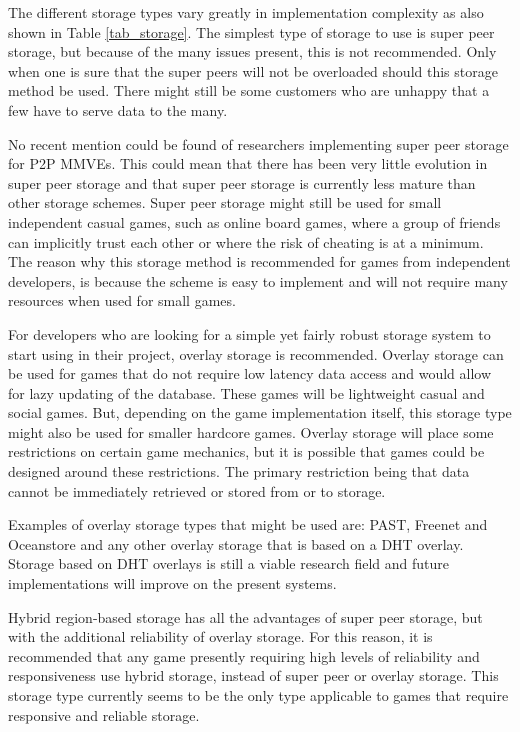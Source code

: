 The different storage types vary greatly in implementation complexity as also shown in Table \ref{tab_storage}. The simplest type of storage to use
is super peer storage, but because of the many issues present, this is not recommended. Only when one is sure that the super peers will not be
overloaded should this storage method be used. There might still be some customers who are unhappy that a few have to serve data to the many.

No recent mention could be found of researchers implementing super peer storage for P2P MMVEs. This could mean that there has been very little
evolution in super peer storage and that super peer storage is currently less mature than other storage schemes. Super peer storage might still be
used for small independent casual games, such as online board games, where a group of friends can implicitly trust each other or where the risk of
cheating is at a minimum. The reason why this storage method is recommended for games from independent developers, is because the scheme is easy to
implement and will not require many resources when used for small games.

For developers who are looking for a simple yet fairly robust storage system to start using in their project, overlay storage is recommended. Overlay
storage can be used for games that do not require low latency data access and would allow for lazy updating of the database. These games will be
lightweight casual and social games. But, depending on the game implementation itself, this storage type might also be used for smaller hardcore
games. Overlay storage will place some restrictions on certain game mechanics, but it is possible that games could be designed around these
restrictions. The primary restriction being that data cannot be immediately retrieved or stored from or to storage.

Examples of overlay storage types that might be used are: PAST, Freenet and Oceanstore and any other overlay storage that is based on a DHT overlay.
Storage based on DHT overlays is still a viable research field and future implementations will improve on the present systems.

Hybrid region-based storage has all the advantages of super peer storage, but with the additional reliability of overlay storage. For this reason, it
is recommended that any game presently requiring high levels of reliability and responsiveness use hybrid storage, instead of super peer or overlay
storage. This storage type currently seems to be the only type applicable to games that require responsive and reliable storage.

